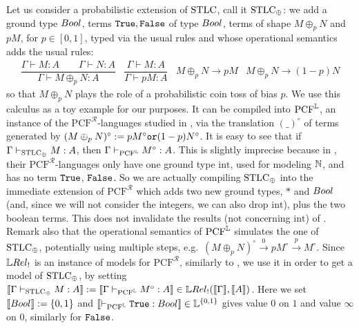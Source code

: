 Let us consider a probabilistic extension of $\mathrm{STLC}$, call it $\mathrm{STLC}_\oplus$:
we add a ground type $\bool$, terms $\mathtt{True},\mathtt{False}$ of type $\bool$, terms of shape $M\oplus_p N$ and $pM$, for $p\in[0,1]$, typed via the usual rules and whose operational semantics adds the usual rules:
{\small{\[\begin{array}{cccc}
           \dfrac{\Gamma\vdash M:A \qquad \Gamma\vdash N:A}{\Gamma\vdash M\oplus_p N:A}
           &
           \dfrac{\Gamma\vdash M:A}{\Gamma\vdash pM:A}
           &
           M\oplus_p N \to pM
           &
           M\oplus_p N \to (1-p)N
          \end{array}\]}}
so that $M\oplus_p N$ plays the role of a probabilistic coin toss of bias $p$.
We use this calculus as a toy example for our purposes.
It can be compiled into $\mathrm{PCF}^{\mathbb{L}}$, an instance of the $\mathrm{PCF}^{\mathcal R}$-languages studied in \cite{Manzo2013}, via the translation $(\_)^\circ$ of terms generated by $(M\oplus_p N)^\circ:=pM^\circ\mathtt{ or } (1-p)N^\circ$.
It is easy to see that if $\Gamma \vdash_{\mathrm{STLC}_\oplus} M:A$, then $\Gamma \vdash_{\mathrm{PCF}^{\mathbb{L}}} M^\circ:A$.
This is slightly imprecise because in \cite{Manzo2013}, their $\mathrm{PCF}^{\mathcal R}$-languages only have one ground type $\mathrm{int}$, used for modeling $\mathbb{N}$, and has no term $\mathtt{True}$, $\mathtt{False}$.
So we are actually compiling $\mathrm{STLC}_\oplus$ into the immediate extension of $\mathrm{PCF}^{\mathcal R}$ which adds two new ground types, $*$ and $\bool$ (and, since we will not consider the integers, we can also drop $\mathrm{int}$), plus the two boolean terms.
This does not invalidate the results (not concerning $\mathrm{int}$) of \cite{Manzo2013}.
Remark also that the operational semantics of $\mathrm{PCF}^{\mathbb{L}}$ \cite[Fig.\ 1]{Manzo2013} simulates the one of $\mathrm{STLC}_\oplus$, potentially using multiple steps, e.g.\ $(M\oplus_p N)^\circ \overset{0}{\rightarrow} pM^\circ \overset{p}{\rightarrow} M^\circ$.
Since $\LREL_!$ is an instance of models for $\mathrm{PCF}^{\mathcal{R}}$, similarly to \cite[Section VI]{Manzo2013}, we use it in order to get a model of $\mathrm{STLC}_\oplus$, by setting $\model{\Gamma \vdash_{\STLC_\oplus} M:A}:=\model{\Gamma \vdash_{\mathrm{PCF}^{\Lawv}} M^\circ:A}\in\HOM{\LREL_!}{\model{\Gamma}}{\model{A}}$.
Here we set $\model{\bool}:=\{0,1\}$ and $\model{\vdash_{\mathrm{PCF}^{\Lawv}} \true:\bool}\in\Lawv^{\{0,1\}}$ gives value $0$ on $1$ and value $\infty$ on $0$, similarly for $\mathtt{False}$.


